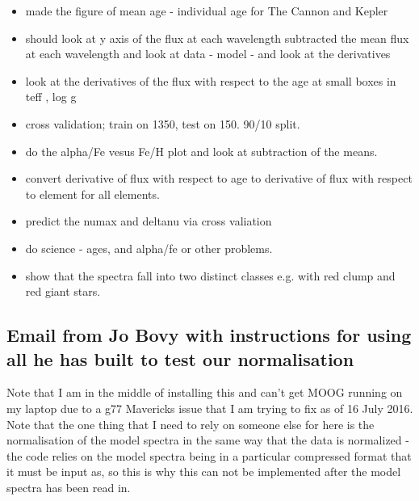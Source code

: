 \documentclass[11pt]{amsart}
\begin{document}
\begin{itemize}
\item made the figure of mean age - individual age for The Cannon and Kepler
\item should look at y axis of the flux at each wavelength subtracted the mean flux at each wavelength and look at data  - model - and look at the derivatives
\end{itemize} 

\begin{itemize}
\item look at the derivatives of the flux with respect to the age at small boxes in teff , log g
\item cross validation; train on 1350, test on 150. 90/10 split.
\item do the alpha/Fe vesus Fe/H plot and look at subtraction of the means.
\item convert derivative of flux with respect to age to derivative of flux with respect to element for all elements.
\item predict the numax and deltanu via cross valiation
\item do science - ages, and alpha/fe or other problems. 
\item show that the spectra fall into two distinct classes e.g. with red clump and red giant stars. 
\end{itemize} 



\pagebreak

\subsection{Email from Jo Bovy with instructions for using all he has built to test our normalisation} 
\vspace{20pt}

Note that I am in the middle of installing this and can't get MOOG running on my laptop due to a g77 Mavericks issue that I am trying to fix as of 16 July 2016.\\

Note that the one thing that I need to rely on someone else for here is the normalisation of the model spectra in the same way that the data is normalized - the code relies on the model spectra being in a particular compressed format that it must be input as, so this is why this can not be implemented after the model spectra has been read in. \\
\end{document}
